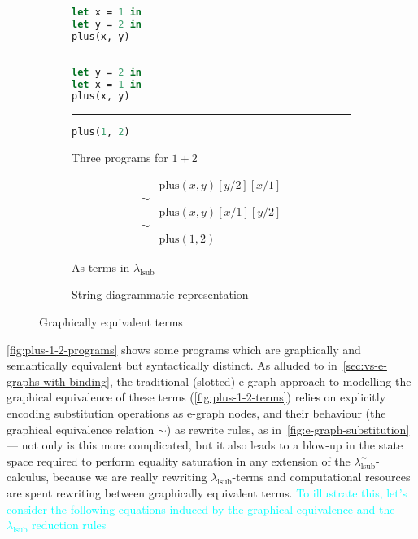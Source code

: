 \begin{figure}
	\centering
	\begin{subfigure}{0.3\linewidth}
		\begin{lstlisting}[language=ML]
let x = 1 in
let y = 2 in
plus(x, y)
                \end{lstlisting}
		\hrule
		\begin{lstlisting}[language=ML]
let y = 2 in
let x = 1 in
plus(x, y)
                \end{lstlisting}
		\hrule
		\begin{lstlisting}[language=ML]
plus(1, 2)
                \end{lstlisting}
		\caption{Three programs for $1 + 2$}%
		\label{fig:plus-1-2-programs}
	\end{subfigure}
	\hspace{2em}
	\begin{subfigure}{0.2\linewidth}
		\begin{align*}
			     & \text{plus}(x, y)[y/2][x/1] \\
			\sim &                             \\
			     & \text{plus}(x, y)[x/1][y/2] \\
			\sim &                             \\
			     & \text{plus}(1, 2)
		\end{align*}
		\caption{As terms in $\lambda_{\text{lsub}}$}%
		\label{fig:plus-1-2-terms}
	\end{subfigure}
	\hspace{2em}
	\begin{subfigure}{0.2\linewidth}
		\centering
		\caption{String diagrammatic representation}%
		\label{fig:plus-1-2-string-diagram}
	\end{subfigure}
	\caption{Graphically equivalent terms}%
	\label{fig:plus-1-2}
\end{figure}

\autoref{fig:plus-1-2-programs} shows some programs which are graphically and semantically equivalent but syntactically distinct.
As alluded to in~\autoref{sec:vs-e-graphs-with-binding}, the traditional (slotted) e-graph approach to modelling the graphical equivalence of these terms (\autoref{fig:plus-1-2-terms}) relies on explicitly encoding substitution operations as e-graph nodes, and their behaviour (the graphical equivalence relation $\sim$) as rewrite rules, as in~\autoref{fig:e-graph-substitution} --- not only is this more complicated, but it also leads to a blow-up in the state space required to perform equality saturation in any extension of the $\lambda^\sim_{\text{lsub}}$-calculus, because we are really rewriting $\lambda_{\text{lsub}}$-terms and computational resources are spent rewriting between graphically equivalent terms.
\textcolor{cyan}{To illustrate this, let's consider the following equations induced by the graphical equivalence and the $\lambda_{\text{lsub}}$ reduction rules}

